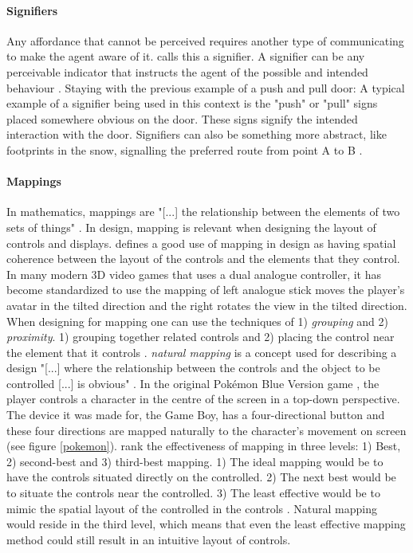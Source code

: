 \paragraph{Signifiers} Any affordance that cannot be perceived requires another type of communicating to make the agent aware of it.  calls this a signifier. A signifier can be any perceivable indicator that instructs the agent of the possible and intended behaviour \cite{norman}. Staying with the previous example of a push and pull door: A typical example of a signifier being used in this context is the "push" or "pull" signs placed somewhere obvious on the door. These signs signify the intended interaction with the door. Signifiers can also be something more abstract, like footprints in the snow, signalling the preferred route from point A to B \cite{norman}.
\paragraph{Mappings} In mathematics, mappings are "[...] the relationship between the elements of two sets of things" \cite[p. 20]{norman}. In design, mapping is relevant when designing the layout of controls and displays.  defines a good use of mapping in design as having spatial coherence between the layout of the controls and the elements that they control. In many modern 3D video games that uses a dual analogue controller, it has become standardized to use the mapping of left analogue stick moves the player's avatar in the tilted direction and the right rotates the view in the tilted direction. When designing for mapping one can use the techniques of 1) \textit{grouping} and 2) \textit{proximity}. 1) grouping together related controls and 2) placing the control near the element that it controls \cite{norman}. \textit{natural mapping} \cite{norman} is a concept used for describing a design "[...] where the relationship between the controls and the object to be controlled [...] is obvious" \cite[p. 115]{norman}. In the original Pokémon Blue Version game \cite{pokemon}, the player controls a character in the centre of the screen in a top-down perspective. The device it was made for, the Game Boy, has a four-directional button and these four directions are mapped naturally to the character's movement on screen (see figure \ref{pokemon}).  rank the effectiveness of mapping in three levels: 1) Best, 2) second-best and 3) third-best mapping. 1) The ideal mapping would be to have the controls situated directly on the controlled. 2) The next best would be to situate the controls near the controlled. 3) The least effective would be to mimic the spatial layout of the controlled in the controls \cite{norman}. Natural mapping would reside in the third level, which means that even the least effective mapping method could still result in an intuitive layout of controls.

